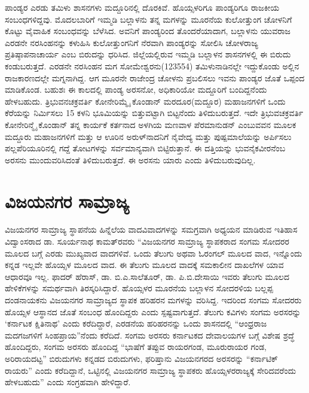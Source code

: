 ಪಾಂಡ್ಯರ ಎರಡು ತಮಿಳು ಶಾಸನಗಳು ಮದ್ದೂರಿನಲ್ಲಿ ದೊರಕಿವೆ. ಹೊಯ್ಸಳರಿಗೂ ಪಾಂಡ್ಯರಿಗೂ ರಾಜಕೀಯ ಸಂಬಂಧಗಳಿ\-ದ್ದವು. ಮೊದಲಬಾರಿಗೆ ಇಮ್ಮಡಿ ಬಲ್ಲಾಳನು ತನ್ನ ಮಗಳನ್ನು ಮೂರನೆಯ ಕುಲೋತ್ತುಂಗ ಚೋಳನಿಗೆ ಕೊಟ್ಟು ವೈವಾಹಿಕ ಸಂಬಂಧವನ್ನು ಬೆಳೆಸಿದ. ಅವನಿಗೆ ಪಾಂಡ್ಯರಿಂದ ತೊಂದರೆಯಾದಾಗ, ಬಲ್ಲಾಳನು ಯುವರಾಜ ಎರಡನೇ ನರಸಿಂಹನನ್ನು ಕಳುಹಿಸಿ ಕುಲೋತ್ತುಂಗನಿಗೆ ನೆರವಾಗಿ ಪಾಂಡ್ಯರನ್ನು ಸೋಲಿಸಿ ಚೋಳರಾಜ್ಯ ಪ್ರತಿಷ್ಠಾಪನಾಚಾರ್ಯ ಎಂಬ ಬಿರುದನ್ನು ಧರಿಸಿದ. ಜಿಲ್ಲೆಯಲ್ಲಿರುವ ಇಮ್ಮಡಿ ಬಲ್ಲಾಳನ ಶಾಸನಗಳಲ್ಲಿ ಈ ಬಿರುದು ಕಂಡುಬರುತ್ತದೆ. ಎರಡನೇ ನರಸಿಂಹನ ಮಗ ಸೋಮೇಶ್ವರನು(1235\enginline{-}54) ತಮಿಳುನಾಡಿನಲ್ಲೇ ಇದ್ದುಕೊಂಡು ಅಲ್ಲಿನ ರಾಜಕಾರಣದಲ್ಲೇ ಮಗ್ನನಾಗಿದ್ದ. ಆಗ ಮೂರನೇ ರಾಜೇಂದ್ರ ಚೋಳನು ಪ್ರಬಲಿಸಲು ಇವನು ಪಾಂಡ್ಯರ ಜೊತೆ ಒಪ್ಪಂದ ಮಾಡಿಕೊಂಡ. ಬಹುಶಃ ಈ ಕಾಲದಲ್ಲಿ ಪಾಂಡ್ಯ ಅರಸನೋ, ಅಧಿಕಾರಿಯೋ ಮದ್ದೂರಿಗೆ ಬಂದಿದ್ದನೆಂದು ಹೇಳಬಹುದು. ತ್ರಿಭುವನಚಕ್ರವರ್ತಿ ಕೋನೇರಿಮ್ಮೈ ಕೊಂಡಾನ್​ ಮರದೂರ(ಮದ್ದೂರ) ಮಹಾಜನಗಳಿಗೆ ಒಂದು ಕೆರೆಯನ್ನು ನಿರ್ಮಿಸಲು 15 ಕಳನಿ ಭೂಮಿಯನ್ನು ಬಿತ್ತುವಟ್ಟಾಗಿ ಬಿಟ್ಟನೆಂದು ತಿಳಿದುಬರುತ್ತದೆ. ಇದೇ ತ್ರಿಭುವಚಕ್ರವರ್ತಿ ಕೋನೇರಿನ್ಮೈ ಕೊಂಡಾನ್​ ತನ್ನ ಕಾರ್ಯಕೆ ಕರ್ತನಾದ ಅಳಗಿಯ ಮಣವಾಳ ಪೆರಮಾನುಡನ್​ ಎಂಬುವವನ ಮೂಲಕ ಮದ್ದೂರು ಮಹಾಜನಗಳಿಗೆ ಮತ್ತು ಆ ಊರಿನ ಅರುಳ್​ನಾದನಿಗೆ ನೈವೇದ್ಯ ಮತ್ತು ಪುಷ್ಪಮಾಲೆಯನ್ನು ಅರ್ಪಿಸಲು ಪಲ್ಲಪೆರಿಯೂರಿನಲ್ಲಿ ಗದ್ದೆ ತೋಟಗಳನ್ನು ಸರ್ವಮಾನ್ಯವಾಗಿ ಬಿಟ್ಟಿರುತ್ತಾನೆ. ಈ ದತ್ತಿಯನ್ನು ಭುವನೈಕವೀರನೆಂಬ ಅರಸನು ಮುಂದುವರಿಸಿದಂತೆ ತಿಳಿದುಬರುತ್ತದೆ. ಈ ಅರಸನು ಯಾರು ಎಂದು ತಿಳಿದುಬರುವುದಿಲ್ಲ.


\section{ವಿಜಯನಗರ ಸಾಮ್ರಾಜ್ಯ}

\vskip -6pt

ವಿಜಯನಗರ ಸಾಮ್ರಾಜ್ಯ ಸ್ಥಾಪನೆಯ ಹಿನ್ನೆಲೆಯ ವಾದವಿವಾದಗಳನ್ನು ಸಮಗ್ರವಾಗಿ ಅಧ್ಯಯನ ಮಾಡಿರುವ ಇತಿಹಾಸ ವಿದ್ವಾಂಸರಾದ ಡಾ. ಸೂರ್ಯನಾಥ ಕಾಮತ್​ರವರು “ವಿಜಯನಗರ ಸಾಮ್ರಾಜ್ಯ ಸ್ಥಾಪಕರಾದ ಸಂಗಮ ಸೋದರರ ಮೂಲದ ಬಗ್ಗೆ ಎರಡು ಮುಖ್ಯವಾದ ವಾದಗಳಿವೆ. ಒಂದು ತೆಲುಗು ಅಥವಾ ಓರಂಗಲ್​ ಮೂಲದ ವಾದ, ಇನ್ನೊಂದು ಕನ್ನಡ ಇಲ್ಲವೇ ಹೊಯ್ಸಳ ಮೂಲದ ವಾದ. ಈ ತೆಲುಗು ಮೂಲದ ವಾದಕ್ಕೆ ಸಮಕಾಲೀನ ದಾಖಲೆಗಳ ಯಾವ ಆಧಾರವೂ ಇಲ್ಲ. ಫಾದರ್​ ಹೆರಾಸ್​, ಡಾ. ಬಿ.ಎ.ಸಾಲೆತೂರ್​, ಡಾ. ಪಿ.ಬಿ.ದೇಸಾಯಿ ಇವರು ತೆಲುಗು ಮೂಲದ ಹೇಳಿಕೆಗಳನ್ನು ಸಮರ್ಥವಾಗಿ ತಿರಸ್ಕರಿಸಿದ್ದಾರೆ. ಹೊಯ್ಸಳರ ಮೂರನೆಯ ಬಲ್ಲಾಳನ ಸೋದರಳಿಯ ಬಲ್ಲಪ್ಪ ದಂಡನಾಯಕನು ವಿಜಯನಗರ ಸಾಮ್ರಾಜ್ಯದ ಸ್ಥಾಪಕ ಹರಿಹರನ ಮಗಳನ್ನು ವರಿಸಿದ್ದ. ಇದರಿಂದ ಸಂಗಮ ಸೋದರರು ಹೊಯ್ಸಳ ಆಸ್ಥಾನದ ಜೊತೆ ಸಂಬಂಧ ಹೊಂದಿದ್ದರು ಎಂದು ಸ್ಪಷ್ಟವಾಗುತ್ತದೆ. ತೆಲುಗು ಕವಿಗಳು ಸಂಗಮ ಅರಸರನ್ನು ‘ಕರ್ನಾಟಕ ಕ್ಷಿತಿನಾಥ’ ಎಂದು ಕರೆದಿದ್ದಾರೆ, ಎರಡನೆಯ ಹರಿಹರನನ್ನು ಒಂದು ಶಾಸನದಲ್ಲಿ “ಆಂಧ್ರರಾಜ ಮದಗಜಗಳಿಗೆ ಸಿಂಹಪ್ರಾಯ”ನೆಂದು ಕರೆದಿದೆ. ಸಂಗಮ ಅರಸರು ಕರ್ನಾಟಕದ ದೇವಾಲಯಗಳ ಬಗ್ಗೆ ವಿಶೇಷ ಶ್ರದ್ಧೆ ಹೊಂದಿದ್ದರು, ಸಂಗಮ ಅರಸರು ಹೊಂದಿದ್ದ “ಭಾಷೆಗೆ ತಪ್ಪುವ ರಾಯರಗಂಡ, ಮೂರುರಾಯರ ಗಂಡ, ಅರಿರಾಯದಟ್ಟ” ಬಿರುದುಗಳು ಕನ್ನಡದ ಬಿರುದುಗಳು, ಫರಿಷ್ತಾನು ವಿಜಯನಗರದ ಅರಸರನ್ನು “ಕರ್ನಾಟಿಕ್​ ರಾಯರು” ಎಂದು ಕರೆದಿದ್ದಾನೆ, ಒಟ್ಟಿನಲ್ಲಿ ವಿಜಯನಗರ ಸಾಮ್ರಾಜ್ಯ ಸ್ಥಾಪಕರು ಹೊಯ್ಸಳರರಾಜ್ಯಕ್ಕೆ ಸೇರಿದವರೆಂದು ಹೇಳಬಹುದು” ಎಂದು ಸಂಗ್ರಹವಾಗಿ ಹೇಳಿದ್ದಾರೆ.

